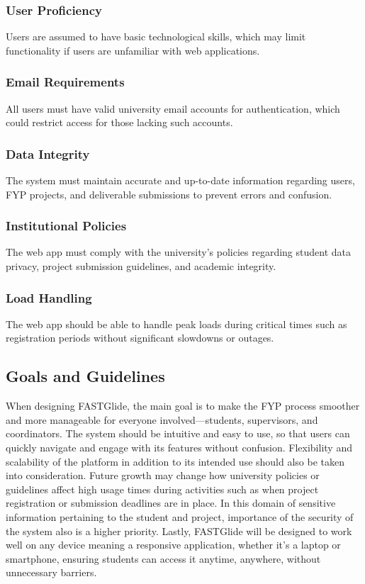 \documentclass{FastFyp}
\begin{document}
\subsubsection{User Proficiency}
Users are assumed to have basic technological skills, which may limit functionality if users are unfamiliar with web applications.

\subsubsection{Email Requirements}
All users must have valid university email accounts for authentication, which could restrict access for those lacking such accounts.

\subsubsection{Data Integrity}
The system must maintain accurate and up-to-date information regarding users, FYP projects, and deliverable submissions to prevent errors and confusion.

\subsubsection{Institutional Policies}
The web app must comply with the university's policies regarding student data privacy, project submission guidelines, and academic integrity.

\subsubsection{Load Handling}
The web app should be able to handle peak loads during critical times such as registration periods without significant slowdowns or outages.


\subsection{Goals and Guidelines}
When designing FASTGlide, the main goal is to make the FYP process smoother and more 
manageable for everyone involved—students, supervisors, and coordinators. The system should be 
intuitive and easy to use, so that users can quickly navigate and engage with its features without 
confusion. Flexibility and scalability of the platform in addition to its intended use should also be taken into consideration. Future growth may change how university policies or guidelines affect high usage times during activities such as when project registration or submission deadlines are in place. In this domain of sensitive information pertaining to the student and project, importance of the security of the system also is a higher priority. Lastly, FASTGlide will be designed to work well on any device meaning a responsive application, whether it’s a laptop or smartphone, ensuring students can access it anytime, anywhere, without unnecessary barriers.
\end{document}

